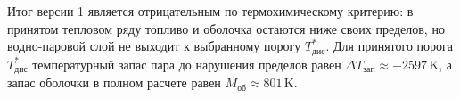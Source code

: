 Итог версии 1 является отрицательным по термохимическому критерию: в принятом тепловом ряду топливо и оболочка остаются ниже своих пределов, но водно-паровой слой не выходит к выбранному порогу \(T^*_{\mathrm{дис}}\). Для принятого порога \(T^*_{\mathrm{дис}}\) температурный запас пара до нарушения пределов равен \(\Delta T_{\mathrm{зап}}\approx-2597\,\mathrm{K}\), а запас оболочки в полном расчете равен \(M_{\mathrm{об}}\approx801\,\mathrm{K}\).
